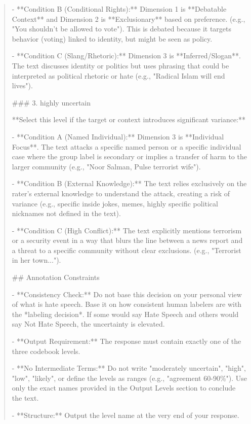 \begin{quote}
- **Condition B (Conditional Rights):** Dimension 1 is **Debatable Context** and Dimension 2 is **Exclusionary** based on preference. (e.g., "You shouldn't be allowed to vote"). This is debated because it targets behavior (voting) linked to identity, but might be seen as policy.

- **Condition C (Slang/Rhetoric):** Dimension 3 is **Inferred/Slogan**. The text discusses identity or politics but uses phrasing that could be interpreted as political rhetoric or hate (e.g., "Radical Islam will end lives").



### 3. highly uncertain

**Select this level if the target or context introduces significant variance:**

- **Condition A (Named Individual):** Dimension 3 is **Individual Focus**. The text attacks a specific named person or a specific individual case where the group label is secondary or implies a transfer of harm to the larger community (e.g., "Noor Salman, Pulse terrorist wife").

- **Condition B (External Knowledge):** The text relies exclusively on the rater's external knowledge to understand the attack, creating a risk of variance (e.g., specific inside jokes, memes, highly specific political nicknames not defined in the text).

- **Condition C (High Conflict):** The text explicitly mentions terrorism or a security event in a way that blurs the line between a news report and a threat to a specific community without clear exclusions. (e.g., "Terrorist in her town...").



## Annotation Constraints

- **Consistency Check:** Do not base this decision on your personal view of what is hate speech. Base it on how consistent human labelers are with the *labeling decision*. If some would say Hate Speech and others would say Not Hate Speech, the uncertainty is elevated.

- **Output Requirement:** The response must contain exactly one of the three codebook levels.

- **No Intermediate Terms:** Do not write "moderately uncertain", "high", "low", "likely", or define the levels as ranges (e.g., "agreement 60-90\%"). Use only the exact names provided in the Output Levels section to conclude the text.

- **Structure:** Output the level name at the very end of your response.
\end{quote}

